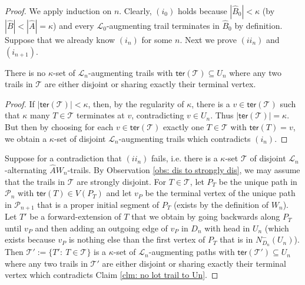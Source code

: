 \documentclass[10pt,a4paper]{amsart}
\begin{document}
\begin{proof}
We apply induction on $ n $. Clearly, $ (i_0) $ holds because $ \left|\widehat{B}_0\right|<\kappa $ (by $ 
\left|\widehat{B}\right|<\left|\widehat{A}\right|=\kappa $) and every $ 
\mathcal{L}_0 $-augmenting trail
terminates in $ 
 \widehat{B}_0 $ by definition. Suppose that we already know $ (i_n) $ for some $ n $.   Next we prove $ (ii_n) $ and $ 
  (i_{n+1})$.
\begin{claim}\label{clm: no lot trail to Un}
 There is no $ \kappa $-set of $ \mathcal{L}_n 
  $-augmenting trails with $ \mathsf{ter}(\mathcal{T})\subseteq U_n $ where any two trails in $ \mathcal{T} $ are either disjoint or sharing 
   exactly their terminal vertex.
\end{claim}
\begin{proof}
If $ \left|\mathsf{ter}(\mathcal{T}) \right|<\kappa$, then, by the regularity of $ \kappa $, there is 
 a 
 $ v\in \mathsf{ter}(\mathcal{T}) $ such that $ \kappa $ many $ T\in \mathcal{T} $ terminates at $ v $, contradicting  $v\in U_n $. Thus $ 
 \left|\mathsf{ter}(\mathcal{T})\right|=\kappa $. But then by choosing for each $ v\in \mathsf{ter}(\mathcal{T}) $ exactly one $ T\in 
 \mathcal{T} $ with $ \mathsf{ter}(T)=v $, we obtain a $ \kappa $-set of disjoint $ \mathcal{L}_n 
 $-augmenting trails which contradicts $ (i_n) $.
\end{proof}
 
 
 

 
 Suppose for a contradiction that $ (ii_n) $ fails, i.e. there is a $ \kappa $-set $ \mathcal{T} $ of disjoint $ \mathcal{L}_n 
 $-alternating $ 
 \widehat{A}W_n $-trails. By Observation \ref{obs: dis to strongly dis}, we may assume that the trails in $ \mathcal{T} $ 
 are strongly disjoint. For $ 
 T\in \mathcal{T} $, let 
 $ P_T $ be the unique path in $ \mathcal{P}_n $ with $ \mathsf{ter}(T)\in V(P_T) $ and let $ v_P $ be the terminal vertex of 
 the unique path in $ \mathcal{P}_{n+1} $ that is a proper initial segment of $ P_T $ (exists by the definition of $ W_n $). 
 Let $ T' $ be a forward-extension of $ 
 T $ that 
 we obtain by going backwards along $ P_T $ until  $ v_P $  and then adding an outgoing edge of $ v_P $ in $ D_n $
 with head in $ U_n $ 
 (which exists because $ v_P $ is nothing else than the first vertex of $ P_T $ that is in $ N_{D_{n}}^{-}(U_n) $). Then $ 
 \mathcal{T}':=\{ T':\ T\in \mathcal{T} \} $ is a $ \kappa $-set of $ \mathcal{L}_n 
 $-augmenting paths with $ \mathsf{ter}(\mathcal{T}')\subseteq U_n $ where any two trails in $ \mathcal{T}' $ are either disjoint or sharing 
 exactly their terminal vertex which contradicts Claim \ref{clm: no lot trail to Un}.
 

\end{proof}
\end{document}
